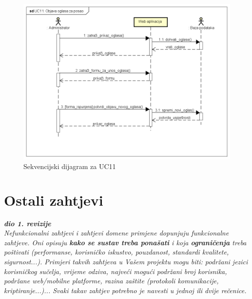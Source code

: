 \begin{figure}[H]
	\includegraphics[width=.9\linewidth]{slike/UC11_Objava_oglasa_za_posao.png}
	\caption{Sekvencijski dijagram za UC11}
	\label{fig:skvDOglas}
\end{figure}
\eject

\section{Ostali zahtjevi}

\textbf{\textit{dio 1. revizije}}\\

\textit{Nefunkcionalni zahtjevi i zahtjevi domene primjene dopunjuju funkcionalne zahtjeve. Oni opisuju \textbf{kako se sustav treba ponašati} i koja \textbf{ograničenja} treba poštivati (performanse, korisničko iskustvo, pouzdanost, standardi kvalitete, sigurnost...). Primjeri takvih zahtjeva u Vašem projektu mogu biti: podržani jezici korisničkog sučelja, vrijeme odziva, najveći mogući podržani broj korisnika, podržane web/mobilne platforme, razina zaštite (protokoli komunikacije, kriptiranje...)... Svaki takav zahtjev potrebno je navesti u jednoj ili dvije rečenice.}

